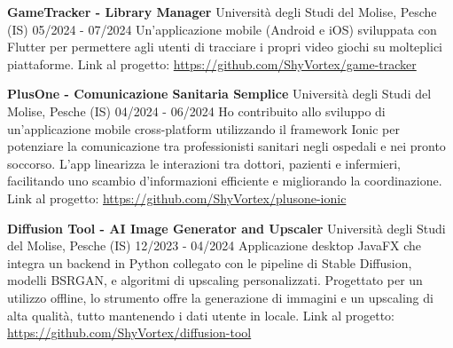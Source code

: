 \documentclass[a4paper, 10pt]{article}
\begin{document}
{		\projHeading
		{\fontsize{13pt}{13pt}\textbf{GameTracker - Library Manager}}
		{Università degli Studi del Molise, Pesche (IS)} {05/2024 - 07/2024}
		{Un'applicazione mobile (Android e iOS) sviluppata con Flutter per permettere agli utenti di tracciare i propri video giochi su molteplici piattaforme.}
		{Link al progetto: \url{https://github.com/ShyVortex/game-tracker}}
		\itemListStart
		\itemListEnd
		\vspace{0.65em}
		
		\projHeading
		{\fontsize{13pt}{13pt}\textbf{PlusOne - Comunicazione Sanitaria Semplice}}
		{Università degli Studi del Molise, Pesche (IS)} {04/2024 - 06/2024}
		{Ho contribuito allo sviluppo di un'applicazione mobile cross-platform utilizzando il framework Ionic per potenziare la comunicazione tra professionisti sanitari negli ospedali e nei pronto soccorso. L'app linearizza le interazioni tra dottori, pazienti e infermieri, facilitando uno scambio d'informazioni efficiente e migliorando la coordinazione.}
		{Link al progetto: \url{https://github.com/ShyVortex/plusone-ionic}}\vspace{0.65em}
		
		\projHeading
		{\fontsize{13pt}{13pt}\textbf{Diffusion Tool - AI Image Generator and Upscaler}}
		{Università degli Studi del Molise, Pesche (IS)} {12/2023 - 04/2024}
		{Applicazione desktop JavaFX che integra un backend in Python collegato con le pipeline di Stable Diffusion, modelli BSRGAN, e algoritmi di upscaling personalizzati. Progettato per un utilizzo offline, lo strumento offre la generazione di immagini e un upscaling di alta qualità, tutto mantenendo i dati utente in locale.}
		{Link al progetto: \url{https://github.com/ShyVortex/diffusion-tool}}
		\itemListStart
		\itemListEnd
		\vspace{0.65em}
		
}
\end{document}
